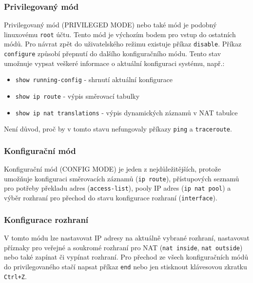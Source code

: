 \subsubsection{Privilegovaný mód}
Privilegovaný mód (PRIVILEGED MODE) nebo také  mód je podobný linuxovému \verb|root| účtu. Tento mód je výchozím bodem pro vstup do ostatních módů. Pro návrat zpět do uživatelského režimu existuje příkaz \verb|disable|. Příkaz \verb|configure| způsobí přepnutí do dalšího konfiguračního módu. Tento stav umožnuje vypsat veškeré informace o aktuální konfiguraci systému, např.:
\begin{itemize}
 \item \verb|show running-config| - shrnutí aktuální konfigurace
 \item \verb|show ip route| - výpis směrovací tabulky
 \item \verb|show ip nat translations| - výpis dynamických záznamů v NAT tabulce
\end{itemize}
Není důvod, proč by v tomto stavu nefungovaly příkazy \verb|ping| a \verb|traceroute|.

\subsubsection{Konfigurační mód}
Konfigurační mód (CONFIG MODE) je jeden z nejdůležitějších, protože umožňuje konfiguraci směrovacích záznamů (\verb|ip route|), přístupových seznamů pro potřeby překladu adres (\verb|access-list|), pooly IP adres (\verb|ip nat pool|) a výběr rozhraní pro přechod do stavu konfigurace rozhraní (\verb|interface|).

\subsubsection{Konfigurace rozhraní} \label{configif}
V tomto módu lze nastavovat IP adresy na aktuálně vybrané rozhraní, nastavovat příznaky pro veřejné a soukromé rozhraní pro NAT (\verb|nat inside|, \verb|nat outside|) nebo také zapínat či vypínat rozhraní. Pro přechod ze všech konfiguračních módů do privilegovaného stačí napsat příkaz \verb|end| nebo jen stisknout klávesovou zkratku \verb|Ctrl+Z|.


